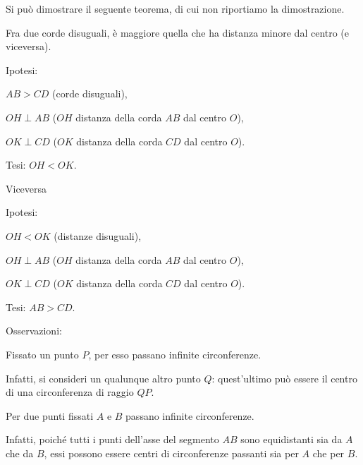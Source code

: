 Si può dimostrare il seguente teorema, di cui non riportiamo la dimostrazione.

\begin{teorema}
Fra due corde disuguali, è maggiore quella che ha distanza minore dal 
centro (e viceversa).
\end{teorema}

\noindent Ipotesi:
\begin{itemize*}
\item \(AB>CD\) (corde disuguali),
\item \(OH\perp AB\) (\(OH\) distanza della corda \(AB\) dal centro \(O\)),
\item \(OK\perp CD\) (\(OK\) distanza della corda \(CD\) dal centro \(O\)).
\end{itemize*}
\noindent Tesi: \(OH < OK\).\vspace{10pt}

\begin{minipage}{0.35\textwidth}
  \centering
\end{minipage}\vspace{10pt}

\noindent Viceversa\vspace{10pt}

\noindent Ipotesi:
\begin{itemize*}
\item \(OH<OK\) (distanze disuguali),
\item \(OH\perp AB\) (\(OH\) distanza della corda \(AB\) dal centro \(O\)),
\item \(OK\perp CD\) (\(OK\) distanza della corda \(CD\) dal centro \(O\)).
\end{itemize*}
\noindent Tesi: \(AB>CD\).


Osservazioni:
\begin{itemize*}
\item Fissato un punto \(P\), per esso passano infinite circonferenze.

Infatti, si consideri un qualunque altro punto \(Q\): quest'ultimo può 
essere il centro di una circonferenza di raggio \(QP\).

\item Per due punti fissati \(A\) e \(B\) passano infinite circonferenze.

Infatti, poiché tutti i punti dell'asse del segmento \(AB\) sono 
equidistanti sia da \(A\) che da \(B\), essi possono essere centri di 
circonferenze passanti sia per \(A\) che per \(B\).
\end{itemize*}

